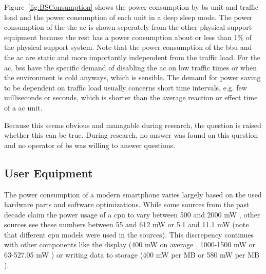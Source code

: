 \documentclass[11pt,a4paper]{article}
\begin{document}
Figure~\ref{fig:BSConsumption} shows the power consumption by \acrshort{bs} unit and traffic load and the power consumption of each unit in a deep sleep mode.
The power consumption of the the \acrshort{ac} is shown seperately from the other physical support equipment because the rest has a power consumption about or less than 1\% of the physical support system.  
Note that the power consumption of the \acrshort{bbu} and the \acrshort{ac} are static and more importantly independent from the traffic load.
For the \acrlong{ac}, \acrlong{bs}s have the specific demand of disabling the \acrshort{ac} on low traffic times or when the environment is cold anyways, which is sensible.
The demand for power saving to be dependent on traffic load usually concerns short time intervals, e.g. few milliseconds or seconds, which is shorter than the average reaction or effect time of a \acrlong{ac} unit.

Because this seems obvious and managable during research, the question is raised whether this can be true.
During research, no answer was found on this question and no operator of \acrshort{bs} was willing to answer questions.

\subsection{User Equipment}\label{subsec:UEConsumption}

The power consumption of a modern smartphone varies largely based on the used hardware parts and software optimizations.
While some sources from the past decade claim the power usage of a \acrshort{cpu} to vary between 500 and 2000 mW \citep{smartphoneEnergyConsumption}, other sources see these numbers between 55 and 612 mW \citep{smartphoneEnergySurvey} or 5.1 and 11.1 mW \citep{mobileEnergyConsumption} (note that different \acrshort{cpu} models were used in the sources).
This discrepency continues with other components like the display (400 mW on average \citep{smartphoneEnergyConsumption}, 1000-1500 mW \citep{powerUsageSmartphonesQnovo} or 63-527.05 mW \citep{smartphoneEnergySurvey}) or writing data to storage (400 mW per MB \citep{powerUsageSmartphonesQnovo} or 580 mW per MB \citep{smartphoneEnergySurvey}).
\end{document}
